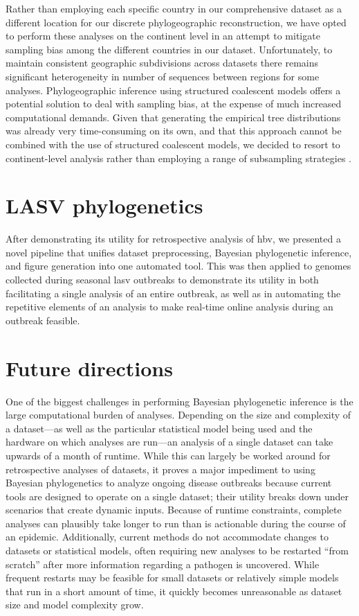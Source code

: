 Rather than employing each specific country in our comprehensive dataset as a different location for our discrete phylogeographic reconstruction, we have opted to perform these analyses on the continent level in an attempt to mitigate sampling bias among the different countries in our dataset.
Unfortunately, to maintain consistent geographic subdivisions across datasets there remains significant heterogeneity in number of sequences between regions for some analyses.
Phylogeographic inference using structured coalescent models \cite{de2015new, muller2018mascot} offers a potential solution to deal with sampling bias, at the expense of much increased computational demands.
Given that generating the empirical tree distributions was already very time-consuming on its own, and that this approach cannot be combined with the use of structured coalescent models, we decided to resort to continent-level analysis rather than employing a range of subsampling strategies \cite{hong2020search}.

\section{LASV phylogenetics}

After demonstrating its utility for retrospective analysis of \gls{hbv}, we presented a novel pipeline that unifies dataset preprocessing, Bayesian phylogenetic inference, and figure generation into one automated tool.
This was then applied to genomes collected during seasonal \gls{lasv} outbreaks to demonstrate its utility in both facilitating a single analysis of an entire outbreak, as well as in automating the repetitive elements of an analysis to make real-time online analysis during an outbreak feasible.

\section{Future directions}

One of the biggest challenges in performing Bayesian phylogenetic inference is the large computational burden of analyses.
Depending on the size and complexity of a dataset---as well as the particular statistical model being used and the hardware on which analyses are run---an analysis of a single dataset can take upwards of a month of runtime.
While this can largely be worked around for retrospective analyses of datasets, it proves a major impediment to using Bayesian phylogenetics to analyze ongoing disease outbreaks because current tools are designed to operate on a single dataset; their utility breaks down under scenarios that create dynamic inputs. %
Because of runtime constraints, complete analyses can plausibly take longer to run than is actionable during the course of an epidemic.
Additionally, current methods do not accommodate changes to datasets or statistical models, often requiring new analyses to be restarted ``from scratch'' after more information regarding a pathogen is uncovered.
While frequent restarts may be feasible for small datasets or relatively simple models that run in a short amount of time, it quickly becomes unreasonable as dataset size and model complexity grow.

